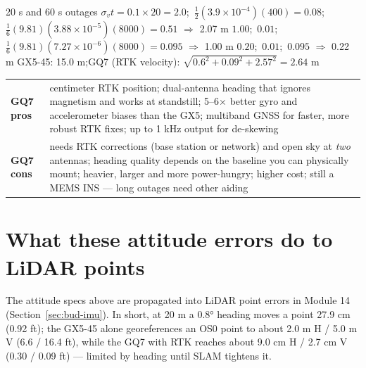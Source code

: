 \begin{worked}{20 s and 60 s outages}
 $\sigma_vt=0.1\times20=2.0$;\ $\tfrac12(3.9\times10^{-4})(400)=0.08$;\ $\tfrac16(9.81)(3.88\times10^{-5})(8000)=0.51$ $\Rightarrow$ 2.07 m
 $1.00$;\ $0.01$;\ $\tfrac16(9.81)(7.27\times10^{-6})(8000)=0.095$ $\Rightarrow$ 1.00 m
 $0.20$;\ $0.01$;\ $0.095$ $\Rightarrow$ 0.22 m
 GX5-45: 15.0 m;\quad GQ7 (RTK velocity): $\sqrt{0.6^2+0.09^2+2.57^2}=2.64$ m
\end{worked}

\begin{center}\small
\renewcommand{\arraystretch}{1.25}
\begin{tabularx}{\linewidth}{>{\bfseries}p{1.6cm}X}\toprule
GQ7 pros & centimeter RTK position; dual-antenna heading that ignores magnetism and works at standstill; 5--6$\times$ better gyro and accelerometer biases than the GX5; multiband GNSS for faster, more robust RTK fixes; up to 1 kHz output for de-skewing\\
GQ7 cons & needs RTK corrections (base station or network) and open sky at \emph{two} antennas; heading quality depends on the baseline you can physically mount; heavier, larger and more power-hungry; higher cost; still a MEMS INS --- long outages need other aiding\\\bottomrule
\end{tabularx}\end{center}


\section{What these attitude errors do to LiDAR points}
The attitude specs above are propagated into LiDAR point errors in Module 14 (Section~\ref{sec:bud-imu}). In short, at 20 m a 0.8° heading moves a point 27.9 cm (0.92 ft); the GX5-45 alone georeferences an OS0 point to about 2.0 m H / 5.0 m V (6.6 / 16.4 ft), while the GQ7 with RTK reaches about 9.0 cm H / 2.7 cm V (0.30 / 0.09 ft) --- limited by heading until SLAM tightens it.


